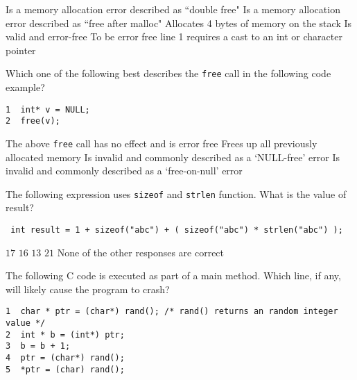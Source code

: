 \begin{answers}
\correctanswer Is a memory allocation error described as ``double free"
\answer Is a memory allocation error described as ``free after malloc"
\answer Allocates 4 bytes of memory on the stack
\answer Is valid and error-free
\answer To be error free line 1 requires a cast to an int or character pointer
\end{answers}
\begin{solution}
\end{solution}


\variant
Which one of the following best describes the {\tt free} call in the following code example?
\begin{verbatim}
1  int* v = NULL;
2  free(v);
\end{verbatim}

\begin{answers}
\correctanswer The above {\tt free} call has no effect and is error free
\answer Frees up all previously allocated memory
\answer Is invalid and commonly described as a `NULL-free' error
\answer Is invalid and commonly described as a `free-on-null' error

\end{answers}
\begin{solution}
\end{solution}



\variant
The following expression uses {\tt sizeof} and {\tt strlen} function. What is the value of result?
\begin{verbatim}
 int result = 1 + sizeof("abc") + ( sizeof("abc") * strlen("abc") );
\end{verbatim}

\begin{answers}
\correctanswer $17$
\answer $16$
\answer $13$
\answer $21$
\answer None of the other responses are correct
\end{answers}
\begin{solution}
\end{solution}


\variant
The following C code is executed as part of a main method. Which line, if any, will likely cause the program to crash?
\begin{verbatim}
1  char * ptr = (char*) rand(); /* rand() returns an random integer value */
2  int * b = (int*) ptr;
3  b = b + 1;
4  ptr = (char*) rand();
5  *ptr = (char) rand();
\end{verbatim}

